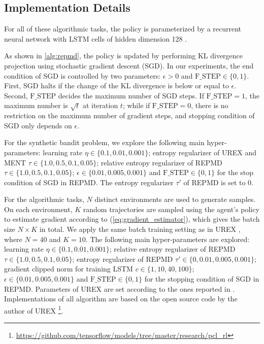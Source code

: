 \subsection{Implementation Details}
\label{subsec:implementation}
For all of these algorithmic tasks, the policy is parameterized by a recurrent neural network with LSTM cells of hidden dimension 128 \citep{hochreiter1997long}. 

As shown in \cref{alg:repmd}, the policy is updated by performing KL divergence projection using stochastic gradient descent (SGD). In our experiments, the end condition of SGD is controlled by two parameters: $\epsilon > 0$ and $\text{F\_STEP}\in \{0,1 \}$. First, SGD halts if the change of the KL divergence is below or equal to $\epsilon$. Second, $\text{F\_STEP}$ decides the maximum number of SGD steps. If $\text{F\_STEP}=1$, the maximum number is $\sqrt{t}$ at iteration $t$; while if $\text{F\_STEP}=0$, there is no restriction on the maximum number of gradient steps, and stopping condition of SGD only depends on $\epsilon$.

For the synthetic bandit problem, we explore the following main hyper-parameters: learning rate $\eta \in \{0.1, 0.01, 0.001\}$; entropy regularizer of UREX and MENT $\tau\in \{1.0, 0.5, 0.1, 0.05\}$; relative entropy regularizer of REPMD $\tau\in \{1.0, 0.5, 0.1, 0.05\}$; $\epsilon\in \{0.01, 0.005, 0.001\}$ and $\text{F\_STEP}\in \{0,1\}$ for the stop condition of SGD in REPMD. The entropy regularizer $\tau'$ of REPMD is set to 0.  

For the algorithmic tasks, $N$ distinct environments are used to generate samples. On each environment, $K$ random trajectories are sampled using the agent's policy to estimate gradient according to (\ref{eq:gradient_estimator}), which gives the batch size $N\times K$ in total. We apply the same batch training setting as in UREX \citep{nachum2017improving}, where $N=40$ and $K=10$. The following main hyper-parameters are explored: learning rate $\eta \in \{0.1, 0.01, 0.001\}$; relative entropy regularizer of REPMD $\tau\in \{1.0, 0.5, 0.1, 0.05\}$; entropy regularizer of REPMD $\tau'\in \{0, 0.01, 0.005, 0.001\}$; gradient clipped norm for training LSTM $c\in \{1, 10, 40, 100\}$; $\epsilon\in \{0.01, 0.005, 0.001\}$ and $\text{F\_STEP}\in \{0,1\}$ for the stopping condition of SGD in REPMD. Parameters of UREX are set according to the ones reported in \citet{nachum2017improving}. Implementations of all algorithm are based on the open source code by the author of UREX \footnote{\url{https://github.com/tensorflow/models/tree/master/research/pcl_rl}}.

